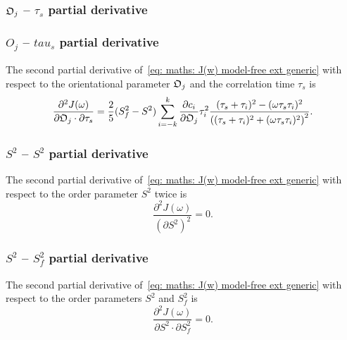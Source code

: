 \begin{latexonly}
    \subsubsection{$\mathfrak{O}_j$ -- $\tau_s$ partial derivative}
\end{latexonly}
\begin{htmlonly}
    \subsubsection{$O_j$ -- $tau_s$ partial derivative}
\end{htmlonly}

The second partial derivative of~\eqref{eq: maths: J(w) model-free ext generic} with respect to the orientational parameter $\mathfrak{O}_j$ and the correlation time $\tau_s$ is
\begin{equation}
    \frac{\partial^2 J(\omega)}{\partial \mathfrak{O}_j \cdot \partial \tau_s} = \frac{2}{5} (S^2_f - S^2) \sum_{i=-k}^k
        \frac{\partial c_i}{\partial \mathfrak{O}_j} \tau_i^2
        \frac{(\tau_s + \tau_i)^2 - (\omega \tau_s \tau_i)^2}{\left((\tau_s + \tau_i)^2 + (\omega \tau_s \tau_i)^2 \right)^2}.
\end{equation}



\subsubsection{$S^2$ -- $S^2$ partial derivative}

The second partial derivative of~\eqref{eq: maths: J(w) model-free ext generic} with respect to the order parameter $S^2$ twice is
\begin{equation}
    \frac{\partial^2 J(\omega)}{(\partial S^2)^2} = 0.
\end{equation}



\subsubsection{$S^2$ -- $S^2_f$ partial derivative}

The second partial derivative of~\eqref{eq: maths: J(w) model-free ext generic} with respect to the order parameters $S^2$ and $S^2_f$ is
\begin{equation}
    \frac{\partial^2 J(\omega)}{\partial S^2 \cdot \partial S^2_f} = 0.
\end{equation}



